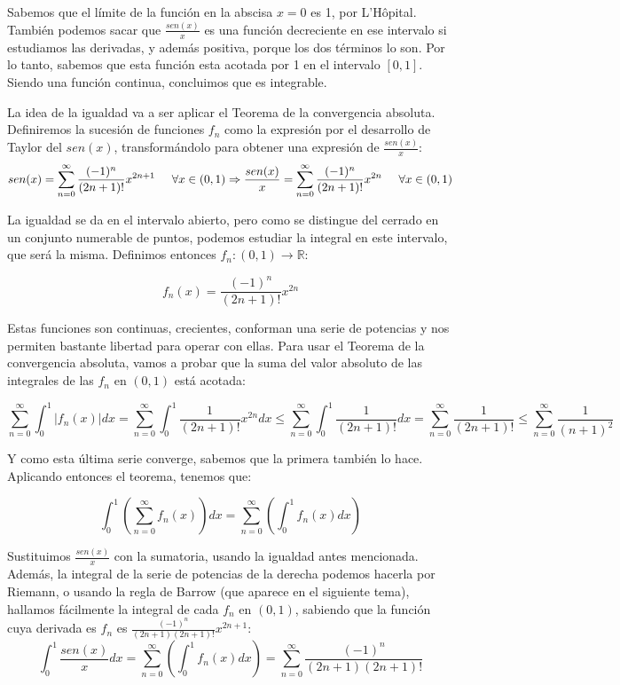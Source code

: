 

Sabemos que el límite de la función en la abscisa $x=0$ es 1, por L'Hôpital. También podemos sacar que $\frac{sen(x)}{x}$ es una función decreciente en ese intervalo si estudiamos las derivadas, y además positiva, porque los dos términos lo son. Por lo tanto, sabemos que esta función esta acotada por 1 en el intervalo $[0,1]$. Siendo una función continua, concluimos que es integrable.

La idea de la igualdad va a ser aplicar el Teorema de la convergencia absoluta. Definiremos la sucesión de funciones $f_n$ como la expresión por el desarrollo de Taylor del $sen(x)$, transformándolo para obtener una expresión de $\frac{sen(x)}{x}$:
$$sen(x) =\sum_{n=0}^{\infty}\frac{(-1)^n}{(2n+1)!}x^{2n+1} \hspace{0.5cm} \forall x \in (0,1) \Rightarrow \frac{sen(x)}{x} =\sum_{n=0}^{\infty}\frac{(-1)^n}{(2n+1)!}x^{2n}\hspace{.5cm} \forall x \in (0,1) $$

La igualdad se da en el intervalo abierto, pero como se distingue del cerrado en un conjunto numerable de puntos, podemos estudiar la integral en este intervalo, que será la misma.
Definimos entonces $f_n : (0,1) \rightarrow \mathds{R}$:

$$f_n(x) = \frac{(-1)^n}{(2n+1)!}x^{2n}$$

Estas funciones son continuas, crecientes, conforman una serie de potencias y nos permiten bastante libertad para operar con ellas. Para usar el Teorema de la convergencia absoluta, vamos a probar que la suma del valor absoluto de las integrales de las $f_n$ en $(0,1)$ está acotada:

$$\sum_{n=0}^{\infty}\int_{0}^{1}|f_n(x)|dx = \sum_{n=0}^{\infty}\int_{0}^{1}\frac{1}{(2n+1)!}x^{2n}dx \leq \sum_{n=0}^{\infty}\int_{0}^{1}\frac{1}{(2n+1)!}dx = \sum_{n=0}^{\infty}\frac{1}{(2n+1)!} \leq \sum_{n=0}^{\infty}\frac{1}{(n+1)^2}$$

Y como esta última serie converge, sabemos que la primera también lo hace. Aplicando entonces el teorema, tenemos que:

$$\int_{0}^{1}\left(\sum_{n=0}^{\infty}f_n(x)\right)dx = \sum_{n=0}^{\infty}\left(\int_{0}^{1}f_n(x) dx\right)$$

Sustituimos $\frac{sen(x)}{x}$ con la sumatoria, usando la igualdad antes mencionada. Además, la integral de la serie de potencias de la derecha podemos hacerla por Riemann, o usando la regla de Barrow (que aparece en el siguiente tema), hallamos fácilmente la integral de cada $f_n$ en $(0,1)$, sabiendo que la función cuya derivada es $f_n$ es $\frac{(-1)^n}{(2n+1)(2n+1)!}x^{2n+1}$:
$$\int_{0}^{1}\frac{sen(x)}{x}dx = \sum_{n=0}^{\infty}\left(\int_{0}^{1}f_n(x) dx\right) =\sum_{n=0}^{\infty}\frac{(-1)^n}{(2n+1)(2n+1)!} $$

